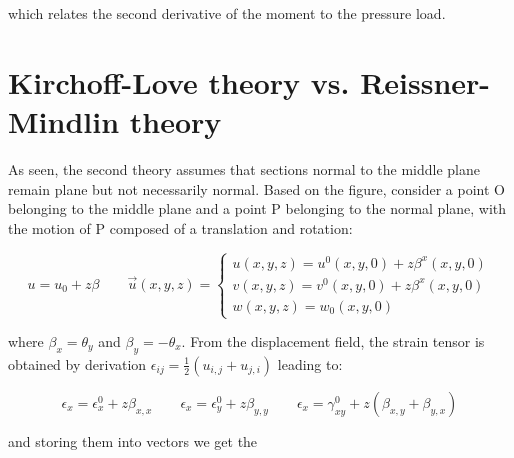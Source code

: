	which relates the second derivative of the moment to the pressure load. 
	
\section{Kirchoff-Love theory vs. Reissner-Mindlin theory}
	As seen, the second theory assumes that sections normal to the middle plane remain plane but not necessarily normal. Based on the figure, consider a point O belonging to the middle plane and a point P belonging to the normal plane, with the motion of P composed of a translation and rotation: 
	
	\begin{equation}
	u = u_0 + z\beta \qquad \vec{u}(x,y,z) = \left\{
	\begin{array}{c}
	u(x,y,z) = u^0(x,y,0) + z\beta ^x (x,y,0)\\
	v(x,y,z) = v^0(x,y,0) + z\beta ^x (x,y,0)\\
	w(x,y,z) = w_0(x,y,0) 
	\end{array}
	\right. 
	\end{equation}
	
	where $\beta _x = \theta _y$ and $\beta _y = - \theta _x$. From the displacement field, the strain tensor is obtained by derivation $\epsilon _{ij} = \frac{1}{2}(u_{i,j} + u_{j,i})$ leading to: 
	
	\begin{equation}
	\epsilon _x = \epsilon _x^0 + z\beta _{x,x} \qquad \epsilon _x = \epsilon _y^0 + z\beta _{y,y} \qquad \epsilon _x = \gamma _{xy}^0 + z(\beta _{x,y} + \beta _{y,x})
	\end{equation}
	
	and storing them into vectors we get the 
	
	\begin{center}
	\end{center}
	
